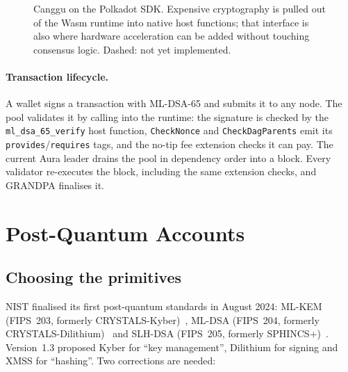 \documentclass[11pt]{article}
\theoremstyle{definition}
\theoremstyle{remark}
\begin{document}
\begin{figure}[ht]
\caption{Canggu on the Polkadot SDK. Expensive cryptography is pulled out of the Wasm runtime
into native host functions; that interface is also where hardware acceleration can be added without
touching consensus logic. Dashed: not yet implemented.}
\label{fig:arch}
\end{figure}

\paragraph{Transaction lifecycle.} A wallet signs a transaction with ML-DSA-65 and submits it to
any node. The pool validates it by calling into the runtime: the signature is checked by the
\texttt{ml\_dsa\_65\_verify} host function, \texttt{CheckNonce} and \texttt{CheckDagParents} emit its
\texttt{provides}/\texttt{requires} tags, and the no-tip fee extension checks it can pay. The
current Aura leader drains the pool in dependency order into a block. Every validator re-executes
the block, including the same extension checks, and GRANDPA finalises it.

\section{Post-Quantum Accounts}
\label{sec:pq}

\subsection{Choosing the primitives}

NIST finalised its first post-quantum standards in August 2024: ML-KEM (FIPS~203, formerly
CRYSTALS-Kyber)~\cite{fips203}, ML-DSA (FIPS~204, formerly CRYSTALS-Dilithium)~\cite{fips204} and
SLH-DSA (FIPS~205, formerly SPHINCS+)~\cite{fips205}. Version~1.3 proposed Kyber for ``key
management'', Dilithium for signing and XMSS for ``hashing''. Two corrections are needed:
\end{document}
